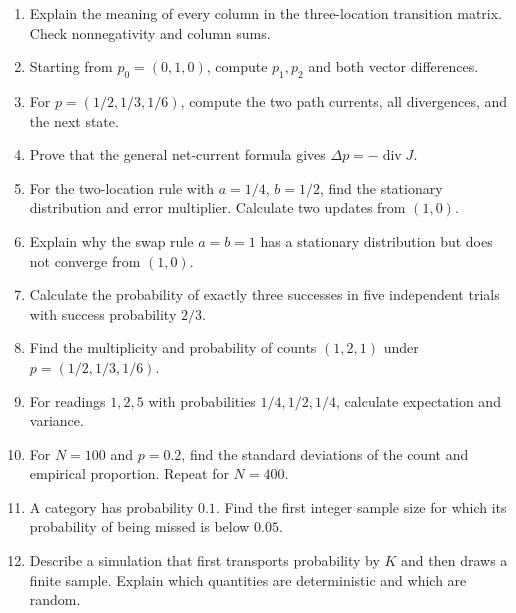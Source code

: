 \documentclass[11pt,oneside,openany]{book}
\theoremstyle{definition}
\theoremstyle{remark}
\newenvironment{exercises}{\begin{enumerate}[label=\thechapter.\arabic*,ref=\thechapter.\arabic*,leftmargin=2.8em,itemsep=6pt]}{\end{enumerate}}
\numberwithin{equation}{chapter}
\begin{document}
\begin{exercises}

\item 

Explain the meaning of every column in the three-location transition matrix. Check nonnegativity and column sums.

\item 

Starting from \(p_0=(0,1,0)\), compute \(p_1,p_2\) and both vector differences.

\item 

For \(p=(1/2,1/3,1/6)\), compute the two path currents, all divergences, and the next state.

\item 

Prove that the general net-current formula gives \(\Delta p=-\operatorname{div}J\).

\item 

For the two-location rule with \(a=1/4\), \(b=1/2\), find the stationary distribution and error multiplier. Calculate two updates from \((1,0)\).

\item 

Explain why the swap rule \(a=b=1\) has a stationary distribution but does not converge from \((1,0)\).

\item 

Calculate the probability of exactly three successes in five independent trials with success probability \(2/3\).

\item 

Find the multiplicity and probability of counts \((1,2,1)\) under \(p=(1/2,1/3,1/6)\).

\item 

For readings \(1,2,5\) with probabilities \(1/4,1/2,1/4\), calculate expectation and variance.

\item 

For \(N=100\) and \(p=0.2\), find the standard deviations of the count and empirical proportion. Repeat for \(N=400\).

\item 

A category has probability \(0.1\). Find the first integer sample size for which its probability of being missed is below \(0.05\).

\item 

Describe a simulation that first transports probability by \(K\) and then draws a finite sample. Explain which quantities are deterministic and which are random.

\end{exercises}
\end{document}

